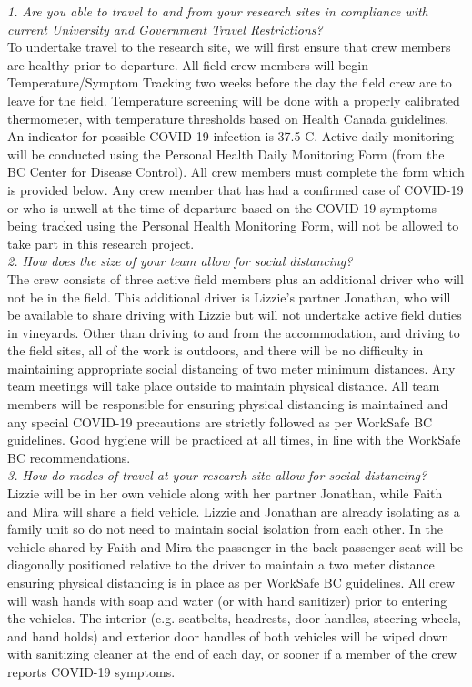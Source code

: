 \documentclass[11pt,letter]{article}
\begin{document}
\emph{1. Are you able to travel to and from your research sites in compliance with current University and Government Travel Restrictions?}\\
To undertake travel to the research site, we will first ensure that crew members are healthy prior to departure. All field crew members will begin Temperature/Symptom Tracking two weeks before the day the field crew are to leave for the field. Temperature screening will be done with a properly calibrated thermometer, with temperature thresholds based on Health Canada guidelines. An indicator for possible COVID-19 infection is 37.5 C. Active daily monitoring will be conducted using the Personal Health Daily Monitoring Form (from the BC Center for Disease Control). All crew members must complete the form which is provided below. Any crew member that has had a confirmed case of COVID-19 or who is unwell at the time of departure based on the COVID-19 symptoms being tracked using the Personal Health Monitoring Form, will not be allowed to take part in this research project.\\
   
\emph{2. How does the size of your team allow for social distancing?}\\
The crew consists of three active field members plus an additional driver who will not be in the field. This additional driver is Lizzie's partner Jonathan, who will be available to share driving with Lizzie but will not undertake active field duties in vineyards. Other than driving to and from the accommodation, and driving to the field sites, all of the work is outdoors, and there will be no difficulty in maintaining appropriate social distancing of two meter minimum distances. Any team meetings will take place outside to maintain physical distance. All team members will be responsible for ensuring physical distancing is maintained and any special COVID-19 precautions are strictly followed as per WorkSafe BC guidelines. Good hygiene will be practiced at all times, in line with the  WorkSafe BC recommendations. \\

\emph{3. How do modes of travel at your research site allow for social distancing?}\\
Lizzie will be in her own vehicle along with her partner Jonathan, while Faith and Mira will share a field vehicle. Lizzie and Jonathan are already isolating as a family unit so do not need to maintain social isolation from each other. In the vehicle shared by Faith and Mira the passenger in the back-passenger seat will be diagonally positioned relative to the driver to maintain a two meter distance ensuring physical distancing is in place as per WorkSafe BC guidelines. All crew will wash hands with soap and water (or with hand sanitizer) prior to entering the vehicles. The interior (e.g. seatbelts, headrests, door handles, steering wheels, and hand holds) and exterior door handles of both vehicles will be wiped down with sanitizing cleaner at the end of each day, or sooner if a member of the crew reports COVID-19 symptoms.\\  
\end{document}
